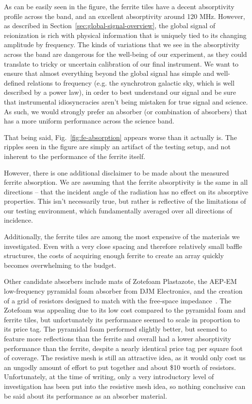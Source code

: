 As can be easily seen in the figure, the ferrite tiles have a decent 
absorptivity profile across the band, and an excellent absorptivity around 120 
MHz. However, as described in Section~\ref{sec:global-signal-overview}, the 
global signal of reionization is rich with physical information that is 
uniquely tied to its changing amplitude by frequency. The kinds of variations 
that we see in the absorptivity across the band are dangerous for the 
well-being of our experiment, as they could translate to tricky or uncertain 
calibration of our final instrument. We want to ensure that almost everything 
beyond the global signal has simple and well-defined relations to frequency 
(e.g. the synchrotron galactic sky, which is well described by a power law), in 
order to best understand our signal and be sure that instrumental 
idiosyncracies aren't being mistaken for true signal and science. As such, we 
would strongly prefer an absorber (or combination of absorbers) that has a more 
uniform performance across the science band.

That being said, Fig.~\ref{fig:fe-absorption} appears worse than it actually 
is. The ripples seen in the figure are simply an artifact of the testing setup, 
and not inherent to the performance of the ferrite itself.

However, there is one additional disclaimer to be made about the measured 
ferrite absorption. We are assuming that the ferrite absorptivity is the same 
in all directions -- that the incident angle of the radiation has no effect on 
its absorptive properties. This isn't necessarily true, but rather is 
reflective of the limitations of our testing environment, which fundamentally 
averaged over all directions of incidence. 

Additionally, the ferrite tiles are among the most expensive of the materials 
we investigated. Even with a very close spacing and therefore relatively small 
baffle structures, the costs of acquiring enough ferrite to create an array 
quickly becomes overwhelming to the budget.

Other candidate absorbers include mats of Zotefoam Plastazote\textregistered, 
the AEP-EM low-frequency pyramidal foam absorber from DJM Electronics, and the 
creation of a grid of resistors designed to match with the free-space 
impedance~\citep{mahesh2015}. The Zotefoam was appealing due to its low cost 
compared to the pyramidal foam and ferrite tiles, but unfortunately its 
performance seemed to scale in proportion to its price tag.  The pyramidal foam 
performed slightly better, but seemed to feature more reflections than the 
ferrite and overall had a lower absorptivity performance than the ferrite, 
despite a nearly identical price tag per square foot of coverage. The resistive 
mesh is still an attractive idea, as it would only cost us an ungodly amount of 
effort to put together and about \$10 worth of resistors. Unfortunately, at the 
time of writing, only a very introductory level of investigation has been put 
into the resistive mesh idea, so nothing conclusive can be said about its 
performance as an absorber material.

